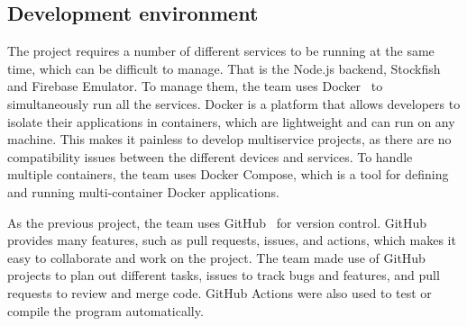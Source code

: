 \subsection{Development environment}\label{subsec:development}

The project requires a number of different services to be running at the same time, which can be difficult to manage.
That is the Node.js backend, Stockfish and Firebase Emulator.
To manage them, the team uses Docker~\cite{docker} to simultaneously run all the services.
Docker is a platform that allows developers to isolate their applications in containers, which are lightweight and can
run on any machine.
This makes it painless to develop multiservice projects, as there are no compatibility issues between the different
devices and services.
To handle multiple containers, the team uses Docker Compose, which is a tool for defining and running multi-container
Docker applications.

As the previous project, the team uses GitHub~\cite{github} for version control.
GitHub provides many features, such as pull requests, issues, and actions, which makes it easy to collaborate and work
on the project.
The team made use of GitHub projects to plan out different tasks, issues to track bugs and features, and pull requests
to review and merge code.
GitHub Actions were also used to test or compile the program automatically.
